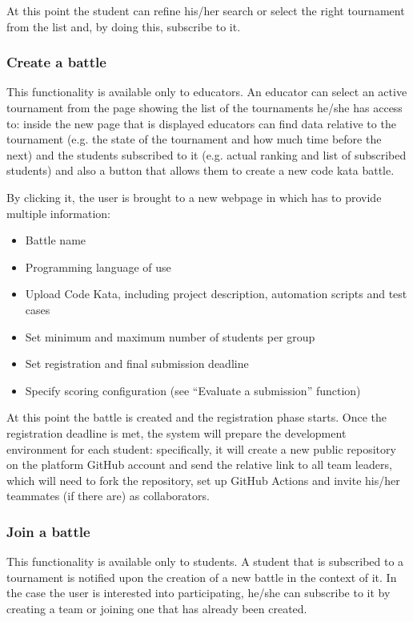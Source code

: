 At this point the student can refine his/her search or select the right tournament from the list and, by doing this, subscribe to it.
\subsubsection{Create a battle}
This functionality is available only to educators. An educator can select an active tournament from the page showing the list of the tournaments he/she has access to: inside the new page that is displayed educators can find data relative to the tournament (e.g. the state of the tournament and how much time before the next) and the students subscribed to it (e.g. actual ranking and list of subscribed students) and also a button that allows them to create a new code kata battle.

By clicking it, the user is brought to a new webpage in which has to provide multiple information:
\begin{itemize}
    \item Battle name
    \item Programming language of use
    \item Upload Code Kata, including project description, automation scripts and test cases
    \item Set minimum and maximum number of students per group
    \item Set registration and final submission deadline
    \item Specify scoring configuration (see “Evaluate a submission” function)
\end{itemize}
At this point the battle is created and the registration phase starts. Once the registration deadline is met, the system will prepare the development environment for each student: specifically, it will create a new public repository on the platform GitHub account and send the relative link to all team leaders, which will need to fork the repository, set up GitHub Actions and invite his/her teammates (if there are) as collaborators.
\subsubsection{Join a battle}
This functionality is available only to students. A student that is subscribed to a tournament is notified upon the creation of a new battle in the context of it. In the case the user is interested into participating, he/she can subscribe to it by creating a team or joining one that has already been created.


